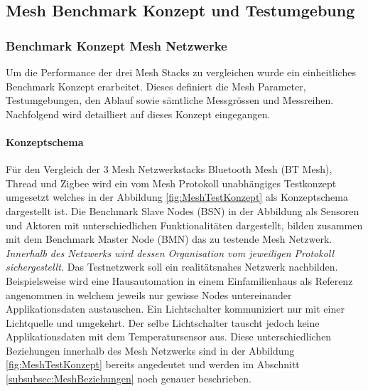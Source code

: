 \vspace*{4cm}
\begin{center}
\part{Mesh Benchmark Konzept und Testumgebung}\label{MeshBenchmarkKonzeptundTestumgebung}
\end{center}
\vspace*{\fill}
\clearpage

\section{Benchmark Konzept Mesh Netzwerke}\label{sec:BenchmarkKonzeptMeshNetzwerke}
Um die Performance der drei Mesh Stacks zu vergleichen wurde ein einheitliches Benchmark Konzept erarbeitet. Dieses definiert die Mesh Parameter, Testumgebungen, den Ablauf sowie sämtliche Messgrössen und Messreihen. Nachfolgend wird detailliert auf dieses Konzept eingegangen.

\subsection{Konzeptschema}\label{subsec:KonzeptschemaMesh}

Für den Vergleich der 3 Mesh Netzwerkstacks Bluetooth Mesh (BT Mesh), Thread und Zigbee wird ein vom Mesh Protokoll unabhängiges Testkonzept umgesetzt welches in der Abbildung \ref{fig:MeshTestKonzept} als Konzeptschema dargestellt ist.
Die Benchmark Slave Nodes (BSN) in der Abbildung als Sensoren und Aktoren mit unterschiedlichen Funktionalitäten dargestellt, bilden zusammen mit dem Benchmark Master Node (BMN) das zu testende Mesh Netzwerk.
\textit{Innerhalb des Netzwerks wird dessen Organisation vom jeweiligen Protokoll sichergestellt.} 
Das Testnetzwerk soll ein realitätsnahes Netzwerk nachbilden.
Beispielsweise wird eine Hausautomation in einem Einfamilienhaus als Referenz angenommen in welchem jeweils nur gewisse Nodes untereinander Applikationsdaten austauschen.
Ein Lichtschalter kommuniziert nur mit einer Lichtquelle und umgekehrt. 
Der selbe Lichtschalter tauscht jedoch keine Applikationsdaten mit dem Temperatursensor aus.
Diese unterschiedlichen Beziehungen innerhalb des Mesh Netzwerks sind in der Abbildung \ref{fig:MeshTestKonzept} bereits angedeutet und werden im Abschnitt \ref{subsubsec:MeshBeziehungen} noch genauer beschrieben.

